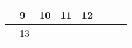 {\begin{tabularx}{\linewidth}{|l!{\vrule width \myLenLineThicknessThick}*{7}{@{}X@{}|}}
       & 
    
      
      
        \begin{minipage}[t]{6mm}\centering{}9\end{minipage}
      
       & 
    
      
      
        \begin{minipage}[t]{6mm}\centering{}10\end{minipage}
      
       & 
    
      
      
        \begin{minipage}[t]{6mm}\centering{}11\end{minipage}
      
       & 
    
      
      
        \begin{minipage}[t]{6mm}\centering{}12\end{minipage}
      
      
        \\  \hline 
      
    
  
  
  
  \hyperlink{week-2025-41}{} &
    
      
      
        \begin{minipage}[t]{6mm}\centering{}13\end{minipage}
      
       & 
    
      
      

\end{tabularx}}
